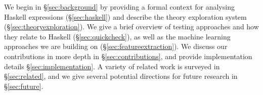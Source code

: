 We begin in \S \ref{sec:background} by providing a formal context for analysing Haskell expressions (\S \ref{sec:haskell}) and describe the \qspec{} theory exploration system (\S \ref{sec:theoryexploration}). We give a brief overview of testing approaches and how they relate to Haskell (\S \ref{sec:quickcheck}), as well as the machine learning approaches we are building on (\S \ref{sec:featureextraction}). We discuss our contributions in more depth in \S \ref{sec:contributions}, and provide implementation details \S \ref{sec:implementation}. A variety of related work is surveyed in \S \ref{sec:related}, and we give several potential directions for future research in \S \ref{sec:future}.
